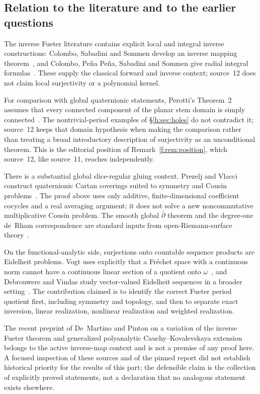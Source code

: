 \documentclass[11pt,a4paper]{article}
\numberwithin{equation}{section}
\theoremstyle{definition}
\theoremstyle{remark}
\theoremstyle{plain}
\begin{document}
\subsection{Relation to the literature and to the earlier questions}
\label{h:sec:literature}

The inverse Fueter literature contains explicit local and integral inverse
constructions: Colombo, Sabadini and Sommen develop an inverse mapping
theorem~\cite{CSS}, and Colombo, Pe\~na Pe\~na, Sabadini and Sommen give radial
integral formulas~\cite{CPSS}. These supply the classical forward and inverse
context; source~12 does not claim local surjectivity or a polynomial kernel.

For comparison with global quaternionic statements, Perotti's Theorem~2
assumes that every connected component of the planar stem domain is simply
connected~\cite{Perottib}. The nontrivial-period examples of
\S\ref{h:sec:holes} do not contradict it; source~12 keeps that domain
hypothesis when making the comparison rather than treating a broad
introductory description of surjectivity as an unconditional theorem. This is
the editorial position of Remark~\ref{f:rem:position}, which source~12, like
source~11, reaches independently.

There is a substantial global slice-regular gluing context. Prezelj and Vlacci
construct quaternionic Cartan coverings suited to symmetry and Cousin
problems~\cite{PV}. The proof above uses only additive, finite-dimensional
coefficient cocycles and a real averaging argument; it does not solve a new
noncommutative multiplicative Cousin problem. The smooth global $\bar\partial$
theorem and the degree-one de~Rham correspondence are standard inputs from
open-Riemann-surface theory~\cite{Forster}.

On the functional-analytic side, surjections onto countable sequence products
are Eidelheit problems. Vogt uses explicitly that a Fr\'echet space with a
continuous norm cannot have a continuous linear section of a quotient onto
$\omega$~\cite{Vogt}, and Debrouwere and Vindas study vector-valued Eidelheit
sequences in a broader setting~\cite{DV}. The contribution claimed is to
identify the correct Fueter period quotient first, including symmetry and
topology, and then to separate exact inversion, linear realization, nonlinear
realization and weighted realization.

The recent preprint of De~Martino and Pinton on a variation of the inverse
Fueter theorem and generalized polyanalytic Cauchy--Kovalevskaya
extension~\cite{DMP} belongs to the active inverse-map context and is not a
premise of any proof here. A focused inspection of these sources and of the
pinned report did not establish historical priority for the results of this
part; the defensible claim is the collection of explicitly proved statements,
not a declaration that no analogous statement exists elsewhere.
\end{document}

